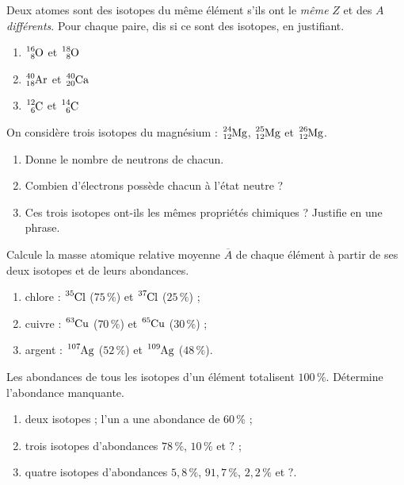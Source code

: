\documentclass[11pt,a4paper]{article}
\begin{document}
\begin{exo}
Deux atomes sont des isotopes du même élément s'ils ont le \emph{même} $Z$ et des $A$
\emph{différents}. Pour chaque paire, dis si ce sont des isotopes, en justifiant.
\begin{enumerate}[label=\alph*)]
  \item $\ce{^{16}_{8}O}$ et $\ce{^{18}_{8}O}$
  \item $\ce{^{40}_{18}Ar}$ et $\ce{^{40}_{20}Ca}$
  \item $\ce{^{12}_{6}C}$ et $\ce{^{14}_{6}C}$
\end{enumerate}
\end{exo}

\begin{exo}
On considère trois isotopes du magnésium : $\ce{^{24}_{12}Mg}$, $\ce{^{25}_{12}Mg}$ et
$\ce{^{26}_{12}Mg}$.
\begin{enumerate}[label=\alph*)]
  \item Donne le nombre de neutrons de chacun.
  \item Combien d'électrons possède chacun à l'état neutre ?
  \item Ces trois isotopes ont-ils les mêmes propriétés chimiques ? Justifie en une phrase.
\end{enumerate}
\end{exo}

\begin{exo}
Calcule la masse atomique relative moyenne $\overline{A}$ de chaque élément à partir de ses deux
isotopes et de leurs abondances.
\begin{enumerate}[label=\alph*)]
  \item chlore : $\ce{^{35}Cl}$ ($75\,\%$) et $\ce{^{37}Cl}$ ($25\,\%$) ;
  \item cuivre : $\ce{^{63}Cu}$ ($70\,\%$) et $\ce{^{65}Cu}$ ($30\,\%$) ;
  \item argent : $\ce{^{107}Ag}$ ($52\,\%$) et $\ce{^{109}Ag}$ ($48\,\%$).
\end{enumerate}
\end{exo}

\begin{exo}
Les abondances de tous les isotopes d'un élément totalisent $100\,\%$. Détermine l'abondance manquante.
\begin{enumerate}[label=\alph*)]
  \item deux isotopes ; l'un a une abondance de $60\,\%$ ;
  \item trois isotopes d'abondances $78\,\%$, $10\,\%$ et $?$ ;
  \item quatre isotopes d'abondances $5{,}8\,\%$, $91{,}7\,\%$, $2{,}2\,\%$ et $?$.
\end{enumerate}
\end{exo}
\end{document}
